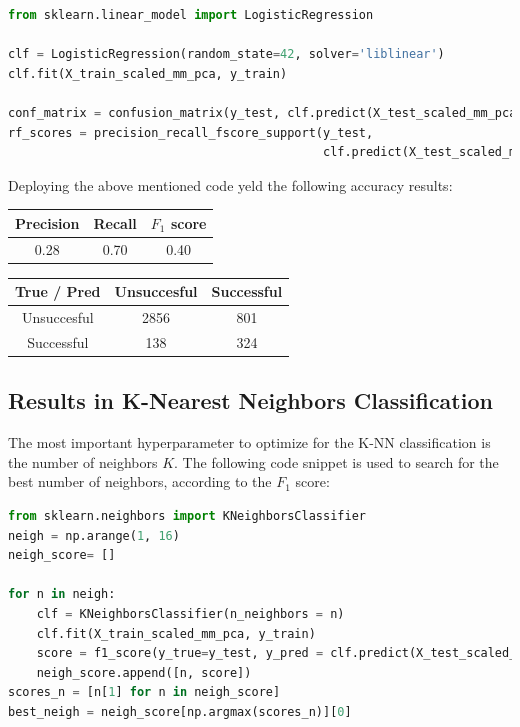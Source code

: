 \begin{lstlisting}[language=Python, caption= Deploying logistic regression]
from sklearn.linear_model import LogisticRegression

clf = LogisticRegression(random_state=42, solver='liblinear')
clf.fit(X_train_scaled_mm_pca, y_train)

conf_matrix = confusion_matrix(y_test, clf.predict(X_test_scaled_mm_pca))
rf_scores = precision_recall_fscore_support(y_test,
                                            clf.predict(X_test_scaled_mm_pca))
\end{lstlisting}
Deploying the above mentioned code yeld the following accuracy results:
\begin{center}
    \begin{tabular}{|c|c|c|}
        \hline
        Precision & Recall & \(F_1\) score \\
        \hline
        0.28 & 0.70 & 0.40 \\
        \hline
    \end{tabular}
    \quad     
    \begin{tabular}{|c|c|c|}
        \hline
         True / Pred & Unsuccesful & Successful \\
        \hline
        Unsuccesful & 2856 & 801 \\
        \hline
        Successful & 138 & 324\\
        \hline
    \end{tabular}
\end{center}

\subsection{Results in K-Nearest Neighbors Classification}
The most important hyperparameter to optimize for the K-NN classification is the number of neighbors \(K\). The following code snippet is used to search for the best number of neighbors, according to the \(F_1\) score:
\begin{lstlisting}[language=Python, caption= Optimizing for number of neighbors]
from sklearn.neighbors import KNeighborsClassifier
neigh = np.arange(1, 16)
neigh_score= []

for n in neigh:
    clf = KNeighborsClassifier(n_neighbors = n)
    clf.fit(X_train_scaled_mm_pca, y_train)
    score = f1_score(y_true=y_test, y_pred = clf.predict(X_test_scaled_mm_pca))
    neigh_score.append([n, score])
scores_n = [n[1] for n in neigh_score]
best_neigh = neigh_score[np.argmax(scores_n)][0]
    \end{lstlisting}

